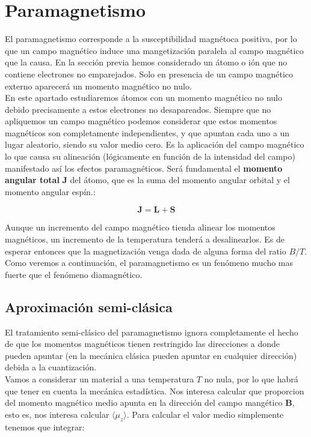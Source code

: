\documentclass[12pt,a4paper]{book}
\numberwithin{equation}{section}
\numberwithin{figure}{section}
\newcommand{\Bn}{\mathbf{B}}
\newcommand{\Jn}{\mathbf{J}}
\newcommand{\Ln}{\mathbf{L}}
\newcommand{\Sn}{\mathbf{S}}
\begin{document}
\section{Paramagnetismo}

El paramagnetismo corresponde a la susceptibilidad magnétoca positiva, por lo que un campo magnético induce una mangetización paralela al campo magnético que la causa. En la sección previa hemos considerado un átomo o ión que no contiene electrones no emparejados. Solo en presencia de un campo magnético externo aparecerá un momento magnético no nulo.  \\

En este apartado estudiaremos átomos con un momento magnético no nulo debido precisamente a estos electrones no desapareados. Siempre que no apliquemos un campo magnético podemos considerar que estos momentos magnéticos son completamente independientes, y que apuntan cada uno a un lugar aleatorio, siendo su valor medio  cero. Es la aplicación del campo magnético lo que causa su alineación (lógicamente en función de la intensidad del campo) manifestado así los efectos paramagnéticos.  Será fundamental el \textbf{momento angular total} $\Jn$ del átomo, que es la suma del momento angular orbital y el momento angular espín.:

\begin{equation}
    \Jn = \Ln + \Sn
\end{equation}

Aunque un incremento del campo magnético tienda alinear los momentos magnéticos, un incremento de la temperatura tenderá a desalinearlos. Es de esperar entonces que la magnetización venga dada de alguna forma del ratio $B/T$. Como veremos a continuación, el paramagnetismo es un fenómeno mucho mas fuerte que el fenómeno diamagnético.


\subsection{Aproximación semi-clásica}

El tratamiento semi-clásico del paramagnetismo ignora completamente el hecho de que los momentos magnéticos tienen restringido las direcciones a donde pueden apuntar (en la mecánica clásica pueden apuntar en cualquier dirección) debida a la cuantización. \\

Vamos a considerar un material a una temperatura $T$ no nula, por lo que habrá que tener en cuenta la mecánica estadística. Nos interesa calcular que proporcion del momento magnético medio apunta en la dirección del campo mangético $\Bn$, esto es, nos interesa calcular $\langle \mu_z \rangle$. Para calcular el valor medio simplemente tenemos que integrar:
\end{document}
